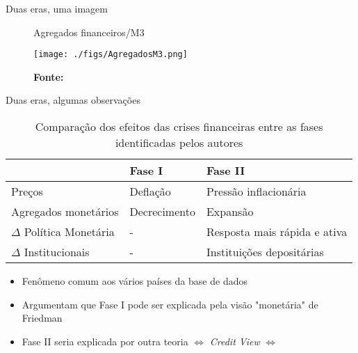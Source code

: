 \documentclass[presentation]{beamer}
\begin{document}
\begin{frame}[label={sec:org1639756}]{Duas eras, uma imagem}
\begin{figure}[htb]
\centering
\caption{Agregados financeiros/M3} 
\texttt{[image: ./figs/AgregadosM3.png]}
\label{fig:agregados}
\caption*{\textbf{Fonte:} \textcite[p.~ 1035]{schularickCreditBoomsGone2012}}
\end{figure}
\end{frame}

\begin{frame}[label={sec:org4a97c89}]{Duas eras, algumas observações}
\begin{table}[htbp]
\caption{Comparação dos efeitos das crises financeiras entre as fases identificadas pelos autores}
\centering
\begin{tabular}{lll}
\hline
 & Fase I & Fase II\\
\hline
Preços & Deflação & Pressão inflacionária\\
Agregados monetários & Decrecimento & Expansão\\
\(\Delta\) Política Monetária & - & Resposta mais rápida e ativa\\
\(\Delta\) Institucionais & - & Instituições depositárias\\
\hline
\end{tabular}
\end{table}

\begin{itemize}
\item Fenômeno comum aos vários países da base de dados
\item Argumentam que Fase I pode ser explicada pela visão "monetária" de Friedman
\item Fase II seria explicada por outra teoria \(\Leftrightarrow\) \emph{Credit View} \(\Leftrightarrow\) \textcite{minsky_1977_Financial}
\end{itemize}
\end{frame}
\end{document}
